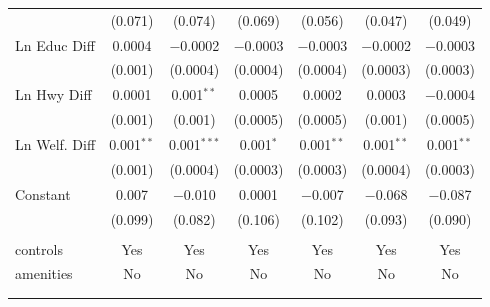 \begin{table}[!htbp]
\begin{tabular}{@{\extracolsep{5pt}}lcccccc}
  & (0.071) & (0.074) & (0.069) & (0.056) & (0.047) & (0.049) \\ 
  Ln Educ Diff & 0.0004 & $-$0.0002 & $-$0.0003 & $-$0.0003 & $-$0.0002 & $-$0.0003 \\ 
  & (0.001) & (0.0004) & (0.0004) & (0.0004) & (0.0003) & (0.0003) \\ 
  Ln Hwy Diff & 0.0001 & 0.001$^{**}$ & 0.0005 & 0.0002 & 0.0003 & $-$0.0004 \\ 
  & (0.001) & (0.001) & (0.0005) & (0.0005) & (0.001) & (0.0005) \\ 
  Ln Welf. Diff & 0.001$^{**}$ & 0.001$^{***}$ & 0.001$^{*}$ & 0.001$^{**}$ & 0.001$^{**}$ & 0.001$^{**}$ \\ 
  & (0.001) & (0.0004) & (0.0003) & (0.0003) & (0.0004) & (0.0003) \\ 
  Constant & 0.007 & $-$0.010 & 0.0001 & $-$0.007 & $-$0.068 & $-$0.087 \\ 
  & (0.099) & (0.082) & (0.106) & (0.102) & (0.093) & (0.090) \\ 
 \hline \\[-1.8ex] 
controls & Yes & Yes & Yes & Yes & Yes & Yes \\ 
amenities & No & No & No & No & No & No \\ 
\hline \\[-1.8ex] 
\hline 
\hline \\[-1.8ex] 
\end{tabular} 
\end{table} 
